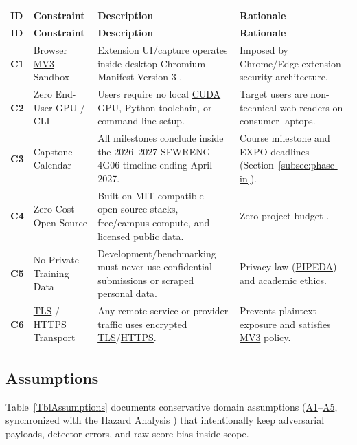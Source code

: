 \documentclass[11pt]{article}
\newcommand{\HTTPS}{\hyperlink{acr-https}{HTTPS}}
\newcommand{\MVThree}{\hyperlink{acr-mv3}{MV3}}
\newcommand{\PIPEDA}{\hyperlink{acr-pipeda}{PIPEDA}}
\newcommand{\CUDA}{\hyperlink{acr-cuda}{CUDA}}
\newcommand{\TLS}{\hyperlink{acr-tls}{TLS}}
\begin{document}
{\small
\begin{tabularx}{\textwidth}{l P{3.3cm} Y Y}
\caption{Mandated External Constraints} \label{TblConstraints}\\
\toprule
\textbf{ID} & \textbf{Constraint} & \textbf{Description} & \textbf{Rationale}\\
\midrule
\endfirsthead
\toprule
\textbf{ID} & \textbf{Constraint} & \textbf{Description} & \textbf{Rationale}\\
\midrule
\endhead
\bottomrule
\endfoot
{}\label{C1}\textbf{C1} & Browser \MVThree{} Sandbox & Extension UI/capture operates inside desktop Chromium Manifest Version 3 \cite{ChromeMV3Spec}. & Imposed by Chrome/Edge extension security architecture.\\
\midrule
{}\label{C2}\textbf{C2} & Zero End-User GPU / CLI & Users require no local \CUDA{} GPU, Python toolchain, or command-line setup. & Target users are non-technical web readers on consumer laptops.\\
\midrule
{}\label{C3}\textbf{C3} & Capstone Calendar & All milestones conclude inside the 2026--2027 SFWRENG 4G06 timeline ending April 2027. & Course milestone and EXPO deadlines (Section~\ref{subsec:phase-in}).\\
\midrule
{}\label{C4}\textbf{C4} & Zero-Cost Open Source & Built on MIT-compatible open-source stacks, free/campus compute, and licensed public data. & Zero project budget \cite{VerityDevPlan2026}.\\
\midrule
{}\label{C5}\textbf{C5} & No Private Training Data & Development/benchmarking must never use confidential submissions or scraped personal data. & Privacy law (\PIPEDA{}) and academic ethics.\\
\midrule
{}\label{C6}\textbf{C6} & \TLS{} / \HTTPS{} Transport & Any remote service or provider traffic uses encrypted \TLS{}/\HTTPS{}. & Prevents plaintext exposure and satisfies \MVThree{} policy.\\
\end{tabularx}
}

\subsection{Assumptions}\label{subsec:assumptions}

Table~\ref{TblAssumptions} documents conservative domain assumptions (\hyperref[A1]{A1}--\hyperref[A5]{A5}, synchronized with the Hazard Analysis \cite{VerityHA2026}) that intentionally keep adversarial payloads, detector errors, and raw-score bias inside scope.
\end{document}
